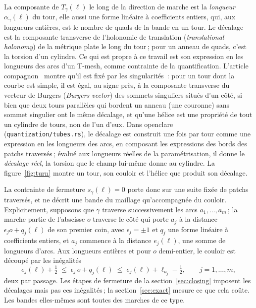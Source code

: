 \documentclass[11pt,a4paper]{article}
\newcommand{\shift}{s}
\begin{document}
La composante de $T_\gamma(\ell)$ le long de la direction de marche est la
\emph{longueur} $\alpha_\gamma(\ell)$ du tour, elle aussi une forme linéaire
à coefficients entiers, qui, aux longueurs entières, est le nombre de quads
de la bande en un tour. Le décalage est la composante transverse de
l'holonomie de translation (\emph{translational holonomy}) de la métrique
plate le long du tour\,; pour un anneau de quads,
c'est la torsion d'un cylindre. Ce qui est propre à ce travail est son
expression en les longueurs des arcs d'un T-mesh, comme contrainte de la
quantification. L'article compagnon~\cite{gardent2026turns} montre qu'il est
fixé par les singularités~: pour un tour dont la courbe est simple, il est
égal, au signe près, à la composante transverse du vecteur de Burgers
(\emph{Burgers vector}) des sommets singuliers situés d'un côté, si bien que
deux tours parallèles qui bordent un anneau (une couronne) sans sommet
singulier ont le même décalage, et qu'une hélice est une propriété de tout
un cylindre de tours, non de l'un d'eux. Dans openclare
(\texttt{quantization/tubes.rs}), le décalage est construit une fois par
tour comme une expression en les longueurs des arcs, en composant les
expressions des bords des patchs traversés\,; évalué aux longueurs réelles
de la paramétrisation, il donne le \emph{décalage réel}, la torsion que le
champ lui-même donne au cylindre. La figure~\ref{fig:turn} montre un tour,
son couloir et l'hélice que produit son décalage.

La contrainte de fermeture $\shift_\gamma(\ell) = 0$ porte donc sur une
suite fixée de patchs traversés, et ne décrit une bande du maillage
qu'accompagnée du couloir. Explicitement, supposons que $\gamma$ traverse
successivement les arcs $a_1, \dots, a_m$\,; la marche partie de l'abscisse
$o$ traverse le côté qui porte $a_j$ à la distance $\epsilon_j o +
q_j(\ell)$ de son premier coin, avec $\epsilon_j = \pm 1$ et $q_j$ une forme
linéaire à coefficients entiers, et $a_j$ commence à la distance
$e_j(\ell)$, une somme de longueurs d'arcs. Aux longueurs entières et pour
$o$ demi-entier, le couloir est découpé par les inégalités
\begin{equation}\label{eq:corridor}
  e_j(\ell) + \tfrac12 \;\le\; \epsilon_j\, o + q_j(\ell) \;\le\; e_j(\ell) +
  \ell_{a_j} - \tfrac12, \qquad j = 1, \dots, m,
\end{equation}
deux par passage. Les étapes de fermeture de la section~\ref{sec:closing}
imposent les décalages mais pas ces inégalités\,; la
section~\ref{sec:exact} mesure ce que cela coûte. Les bandes elles-mêmes
sont toutes des marches de ce type.
\end{document}
